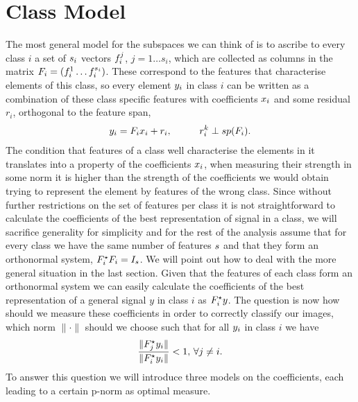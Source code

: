 \documentclass[11pt]{article}
\begin{document}
\section{Class Model}
The most general model for the subspaces we can think of is to ascribe to every class $i$ a set of ${s}_i$ vectors ${f}_i^j$, $j=1\ldots s_i$, which are collected as columns in the matrix ${F}_i= ({f}_i^1\ldots {f}_i^{s_i})$. These correspond to the features that characterise elements of this class, so every element ${y}_i$ in class $i$ can be written as a combination of these class specific features with coefficients $x_i$ and some residual $r_i$, orthogonal to the feature span,
\begin{align}
{y}_i= {F}_i x_i + r_i, \hspace{1cm} r_i^k \perp sp(F_i).
\end{align}
The condition that features of a class well characterise the elements in it translates into a property of the coefficients $x_i$, \ie when measuring their strength in some norm it is higher than the strength of the coefficients we would obtain trying to represent the element by features of the wrong class.
Since without further restrictions on the set of features per class it is not straightforward to calculate the coefficients of the best representation of signal in a class, we will sacrifice generality for simplicity and for the rest of the analysis assume that for every class we have the same number of features ${s}$ and that they form an orthonormal system, \ie $ {F}_i^\star {F}_i = I_s$. We will point out how to deal with the more general situation in the last section. Given that the features of each class form an orthonormal system we can easily calculate the coefficients of the best representation of a general signal $y$ in class  $i$ as ${F}_i^\star {y}$. The question is now how should we measure these coefficients in order to correctly classify our images, \ie which norm $\|\cdot\|$ should we choose such that for all ${y}_i$ in class $i$ we have
\begin{align}
\frac{\| {F}_j^\star {y}_i \|}{\| {F}_i^\star {y}_i \|} < 1,\, \forall j \neq i.
\end{align}
To answer this question we will introduce three models on the coefficients, each leading to a certain p-norm as optimal measure.

\end{document}
